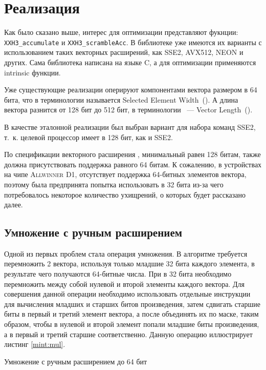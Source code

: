 
\section{Реализация}
Как было сказано выше, интерес для оптимизации представляют фукнции: \texttt{XXH3\_accumulate} и \texttt{XXH3\_scrambleAcc}.
В библиотеке уже имеются их варианты с использованием таких векторных расширений, как \textsc{SSE2, AVX512, NEON} и других.
Сама библиотека написана на языке \textsc{C}, а для оптимизации применяются intrinsic функции.

Уже существующие реализации оперируют компонентами вектора размером в 64 бита, что в терминологии \riscv{} называется Selected Element Width~(\sew{}).
А длина вектора разнится от 128 бит до 512 бит, в терминологии \riscv{}~--- Vector Length~(\vl{}).

В качестве эталонной реализации был выбран вариант для набора команд \textsc{SSE2}, т.~к. целевой процессор имеет \vl{} в 128 бит, как и \textsc{SSE2}.

По спецификации векторного расширения \riscv{}, минимальный \vl{} равен 128 битам, также должна присутствовать поддержка \sew{} равного 64 битам.
К сожалению, в устройствах на чипе \textsc{Allwinner D1}, отсутствует поддержка 64-битных элементов вектора, поэтому была предпринята попытка использовать \sew{} в 32 бита из-за чего потребовалось некоторое количество ухищрений, о которых будет рассказано далее.

\subsection{Умножение с ручным расширением}
Одной из первых проблем стала операция умножения.
В алгоритме требуется перемножить 2 вектора, используя только младшие 32 бита каждого элемента, в результате чего получаются 64-битные числа.
При \sew{} в 32 бита необходимо перемножить между собой нулевой и второй элементы каждого вектора.
Для совершения данной операции необходимо использовать отдельные инструкции для вычисления младших и старших битов произведения, затем сдвигать старшие биты в первый и третий элемент вектора, а после объединять их по маске, таким образом, чтобы в нулевой и второй элемент попали младшие биты произведения, а в первый и третий старшие соответственно.
Данную операцию иллюстрирует листинг \ref{mint:mul}.
\begin{listing}
	\caption{Умножение с ручным расширением до 64 бит}
	\label{mint:mul}
	\inputminted[breaklines, frame=single]{c}{figures/mul.c}
\end{listing}

